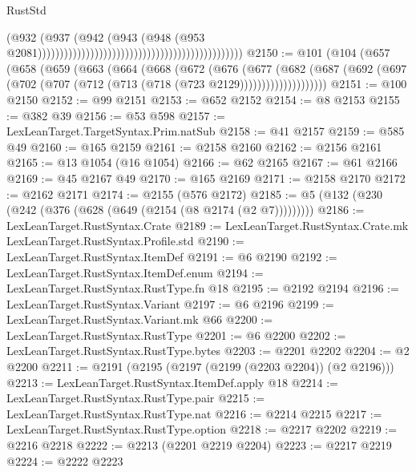 \begin{lexlean}{RustStd}
\begin{coremodule}
                                                                                      (@932
                                                                                        (@937
                                                                                          (@942
                                                                                            (@943
                                                                                              (@948
                                                                                                (@953
                                                                                                  @2081)))))))))))))))))))))))))))))))))))))))))))))))
@2150 := @101
    (@104
      (@657
        (@658
          (@659
            (@663
              (@664
                (@668
                  (@672
                    (@676
                      (@677
                        (@682
                          (@687
                            (@692
                              (@697 (@702 (@707 (@712 (@713 (@718 (@723 @2129))))))))))))))))))))
@2151 := @100 @2150
@2152 := @99 @2151
@2153 := @652 @2152
@2154 := @8 @2153
@2155 := @382 @39
@2156 := @53 @598
@2157 := LexLeanTarget.TargetSyntax.Prim.natSub
@2158 := @41 @2157
@2159 := @585 @49
@2160 := @165 @2159
@2161 := @2158 @2160
@2162 := @2156 @2161
@2165 := @13 @1054 (@16 @1054)
@2166 := @62 @2165
@2167 := @61 @2166
@2169 := @45 @2167 @49
@2170 := @165 @2169
@2171 := @2158 @2170
@2172 := @2162 @2171
@2174 := @2155 (@576 @2172)
@2185 := @5 (@132 (@230 (@242 (@376 (@628 (@649 (@2154 (@8 @2174 (@2 @7)))))))))
@2186 := LexLeanTarget.RustSyntax.Crate
@2189 := LexLeanTarget.RustSyntax.Crate.mk LexLeanTarget.RustSyntax.Profile.std
@2190 := LexLeanTarget.RustSyntax.ItemDef
@2191 := @6 @2190
@2192 := LexLeanTarget.RustSyntax.ItemDef.enum
@2194 := LexLeanTarget.RustSyntax.RustType.fn @18
@2195 := @2192 @2194
@2196 := LexLeanTarget.RustSyntax.Variant
@2197 := @6 @2196
@2199 := LexLeanTarget.RustSyntax.Variant.mk @66
@2200 := LexLeanTarget.RustSyntax.RustType
@2201 := @6 @2200
@2202 := LexLeanTarget.RustSyntax.RustType.bytes
@2203 := @2201 @2202
@2204 := @2 @2200
@2211 := @2191 (@2195 (@2197 (@2199 (@2203 @2204)) (@2 @2196)))
@2213 := LexLeanTarget.RustSyntax.ItemDef.apply @18
@2214 := LexLeanTarget.RustSyntax.RustType.pair
@2215 := LexLeanTarget.RustSyntax.RustType.nat
@2216 := @2214 @2215
@2217 := LexLeanTarget.RustSyntax.RustType.option
@2218 := @2217 @2202
@2219 := @2216 @2218
@2222 := @2213 (@2201 @2219 @2204)
@2223 := @2217 @2219
@2224 := @2222 @2223

\end{coremodule}
\end{lexlean}
